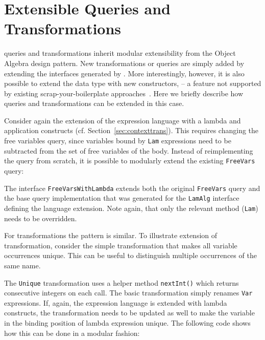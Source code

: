 

\section{Extensible Queries and Transformations}
\label{SECT:extensible}


\noindent \name queries and transformations inherit modular
extensibility from the Object Algebra design pattern.  New
transformations or queries are simply added by extending the
interfaces generated by \name.  More interestingly, however, it is
also possible to extend the data type with new constructors, -- a
feature not supported by existing scrap-your-boilerplate
approaches~\cite{ralf03syb,lammel04syb}.  Here we
briefly describe how queries and transformations can be extended in
this case.


Consider again the extension of the expression language with a lambda and application constructs (cf. Section~\ref{sec:contexttrans}).
This requires changing the free variables query, since variables bound by \lstinline{Lam} expressions need to be subtracted from the set of free variables of the body.
Instead of reimplementing the query from scratch, it is possible to modularly extend the existing \lstinline{FreeVars} query:


The interface \lstinline{FreeVarsWithLambda} extends both the original \lstinline{FreeVars} query and the base query implementation that was generated for the \lstinline{LamAlg} interface defining the language extension.
Note again, that only the relevant method (\lstinline{Lam}) needs to be overridden.


For transformations the pattern is similar.
To illustrate extension of transformation, consider the simple transformation that makes all variable occurrences unique.
This can be useful to distinguish multiple occurrences of the same name.


The \lstinline{Unique} transformation uses a helper method \lstinline{nextInt()} which returns consecutive integers on each call.
The basic transformation simply renames \lstinline{Var} expressions.
If, again, the expression language is extended with lambda constructs, the transformation needs to be updated as well to make the variable in the binding position of lambda expression unique.
The following code shows how this can be done in a modular fashion:

